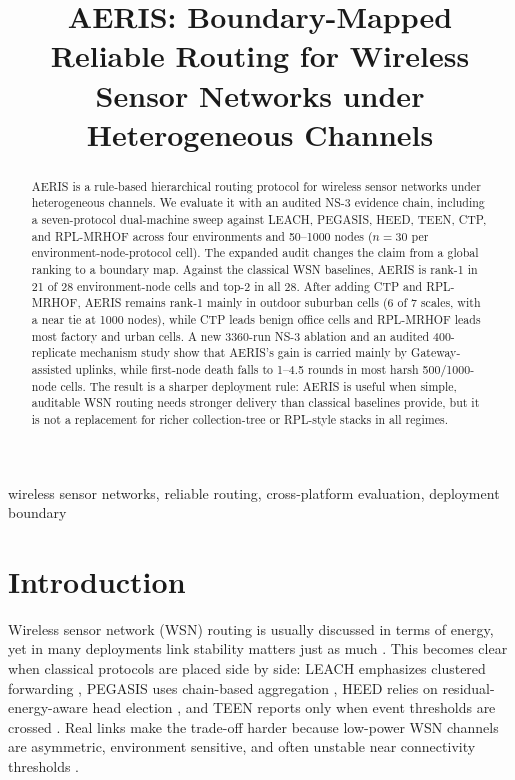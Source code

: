 \documentclass[conference]{IEEEtran}
\title{AERIS: Boundary-Mapped Reliable Routing for Wireless Sensor Networks under Heterogeneous Channels}
\author{
\IEEEauthorblockN{Kangrui Li, Junyi Lin, and Xiaobo Zhang}
\IEEEauthorblockA{Faculty of Automation, Guangdong University of Technology, Guangzhou 510006, China\\
\textit{Corresponding author:} Kangrui Li \texttt{1403073295@mails.gdut.edu.cn}}
}
\begin{document}
\maketitle

\begin{abstract}
AERIS is a rule-based hierarchical routing protocol for wireless sensor networks under heterogeneous channels. We evaluate it with an audited NS-3 evidence chain, including a seven-protocol dual-machine sweep against LEACH, PEGASIS, HEED, TEEN, CTP, and RPL-MRHOF across four environments and 50--1000 nodes ($n=30$ per environment-node-protocol cell). The expanded audit changes the claim from a global ranking to a boundary map. Against the classical WSN baselines, AERIS is rank-1 in 21 of 28 environment-node cells and top-2 in all 28. After adding CTP and RPL-MRHOF, AERIS remains rank-1 mainly in outdoor suburban cells (6 of 7 scales, with a near tie at 1000 nodes), while CTP leads benign office cells and RPL-MRHOF leads most factory and urban cells. A new 3360-run NS-3 ablation and an audited 400-replicate mechanism study show that AERIS's gain is carried mainly by Gateway-assisted uplinks, while first-node death falls to 1--4.5 rounds in most harsh 500/1000-node cells. The result is a sharper deployment rule: AERIS is useful when simple, auditable WSN routing needs stronger delivery than classical baselines provide, but it is not a replacement for richer collection-tree or RPL-style stacks in all regimes.
\end{abstract}

\begin{IEEEkeywords}
wireless sensor networks, reliable routing, cross-platform evaluation, deployment boundary
\end{IEEEkeywords}

\section{Introduction}
Wireless sensor network (WSN) routing is usually discussed in terms of energy, yet in many deployments link stability matters just as much \cite{Akyildiz2002Survey,Rault2014Energy,Kandris2009Power}. This becomes clear when classical protocols are placed side by side: LEACH emphasizes clustered forwarding \cite{Heinzelman2000LEACH}, PEGASIS uses chain-based aggregation \cite{Lindsey2002PEGASIS}, HEED relies on residual-energy-aware head election \cite{Younis2004HEED}, and TEEN reports only when event thresholds are crossed \cite{Manjeshwar2001TEEN}. Real links make the trade-off harder because low-power WSN channels are asymmetric, environment sensitive, and often unstable near connectivity thresholds \cite{Zuniga2004,Zuniga2007Asymmetry,Baccour2012RLQE}.
\end{document}
